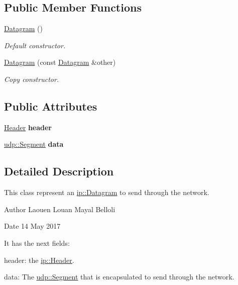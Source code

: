 \subsection*{Public Member Functions}
\begin{DoxyCompactItemize}
\item 
\hyperlink{structip_1_1Datagram_a22c9da8b488b020705bf92f0d5e2f88f}{Datagram} ()
\begin{DoxyCompactList}\small\item\em Default constructor. \end{DoxyCompactList}\item 
\hyperlink{structip_1_1Datagram_a9b701e9ceeeacc10ae5df56bccde8f51}{Datagram} (const \hyperlink{structip_1_1Datagram}{Datagram} \&other)
\begin{DoxyCompactList}\small\item\em Copy constructor. \end{DoxyCompactList}\end{DoxyCompactItemize}
\subsection*{Public Attributes}
\begin{DoxyCompactItemize}
\item 
\hyperlink{structip_1_1Header}{Header} {\bfseries header}\hypertarget{structip_1_1Datagram_ab2f6057ca4c00b3c1d9637a5e7b6c144}{}\label{structip_1_1Datagram_ab2f6057ca4c00b3c1d9637a5e7b6c144}

\item 
\hyperlink{structudp_1_1Segment}{udp\+::\+Segment} {\bfseries data}\hypertarget{structip_1_1Datagram_a4de3ad46fa81bc6d312c2e77321e59d1}{}\label{structip_1_1Datagram_a4de3ad46fa81bc6d312c2e77321e59d1}

\end{DoxyCompactItemize}


\subsection{Detailed Description}
This class represent an \hyperlink{structip_1_1Datagram}{ip\+::\+Datagram} to send through the network. 

\begin{DoxyAuthor}{Author}
Laouen Louan Mayal Belloli 
\end{DoxyAuthor}
\begin{DoxyDate}{Date}
14 May 2017
\end{DoxyDate}
It has the next fields\+:
\begin{DoxyEnumerate}
\item header\+: the \hyperlink{structip_1_1Header}{ip\+::\+Header}.
\item data\+: The \hyperlink{structudp_1_1Segment}{udp\+::\+Segment} that is encapsulated to send through the network. 
\end{DoxyEnumerate}

